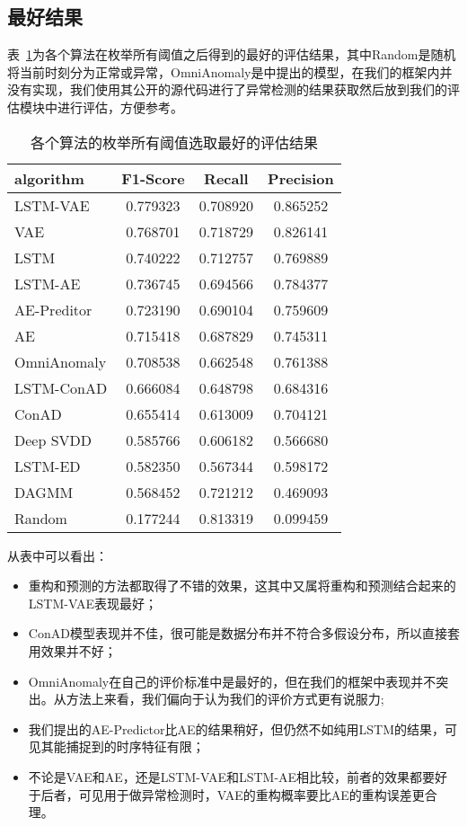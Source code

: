 \subsection{最好结果}
表~\ref{tab:best}为各个算法在枚举所有阈值之后得到的最好的评估结果，其中Random是随机将当前时刻分为正常或异常，OmniAnomaly是\cite{su2019robust}中提出的模型，在我们的框架内并没有实现，我们使用其公开的源代码进行了异常检测的结果获取然后放到我们的评估模块中进行评估，方便参考。
\begin{table}
  \centering
\begin{tabular}{lccc}
  \toprule
          algorithm &  F1-Score &    Recall &  Precision \\
  \midrule
   LSTM-VAE &  0.779323 &  0.708920 &   0.865252 \\
        VAE &  0.768701 &  0.718729 &   0.826141 \\
     LSTM &  0.740222 &  0.712757 &   0.769889 \\
            LSTM-AE &  0.736745 &  0.694566 &   0.784377 \\
       AE-Preditor &  0.723190 &  0.690104 &   0.759609 \\
                 AE &  0.715418 &  0.687829 &   0.745311 \\
                 OmniAnomaly &  0.708538 &  0.662548 &   0.761388 \\
         LSTM-ConAD &  0.666084 &  0.648798 &   0.684316 \\
              ConAD &  0.655414 &  0.613009 &   0.704121 \\
          Deep SVDD &  0.585766 &  0.606182 &   0.566680 \\
            LSTM-ED &  0.582350 &  0.567344 &   0.598172 \\
              DAGMM &  0.568452 &  0.721212 &   0.469093 \\
             Random &  0.177244 &  0.813319 &   0.099459 \\
  \bottomrule
  \end{tabular}
  \caption{各个算法的枚举所有阈值选取最好的评估结果}
  \label{tab:best}
\end{table}

从表中可以看出：
\begin{itemize}
  \item 重构和预测的方法都取得了不错的效果，这其中又属将重构和预测结合起来的LSTM-VAE表现最好；
  \item ConAD模型表现并不佳，很可能是数据分布并不符合多假设分布，所以直接套用效果并不好；
  \item OmniAnomaly在自己的评价标准中是最好的，但在我们的框架中表现并不突出。从方法上来看，我们偏向于认为我们的评价方式更有说服力;
  \item 我们提出的AE-Predictor比AE的结果稍好，但仍然不如纯用LSTM的结果，可见其能捕捉到的时序特征有限；
  \item 不论是VAE和AE，还是LSTM-VAE和LSTM-AE相比较，前者的效果都要好于后者，可见用于做异常检测时，VAE的重构概率要比AE的重构误差更合理。
\end{itemize}
